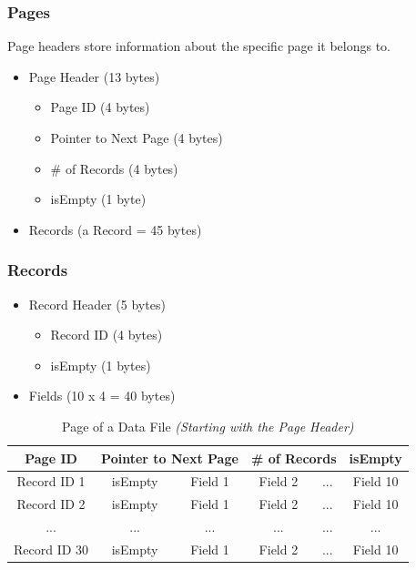 \documentclass[12pt,a4paper]{article}
\begin{document}
        \subsubsection{Pages}
            Page headers store information about the specific page it belongs to.
            \begin{itemize}
              \item Page Header (13 bytes)
                \begin{itemize}
                     \item Page ID (4 bytes)
                    \item Pointer to Next Page (4 bytes)
                     \item \# of Records (4 bytes)
                     \item isEmpty (1 byte)
                \end{itemize}
              \item Records (a Record = 45 bytes)
            \end{itemize}
        \subsubsection{Records}
            \begin{itemize}
              \item Record Header (5 bytes)
                \begin{itemize}
                     \item Record ID (4 bytes)
                    \item isEmpty (1 bytes)
                \end{itemize}
              \item Fields (10 x 4 = 40 bytes)
            \end{itemize}

        \begin{table}[h!]
            \begin{center}
                \begin{tabular}{ | c | c | c | c | c | c | }
                \hline
                    \multicolumn{1}{||c|}{Page ID} &
                    \multicolumn{2}{|c|}{Pointer to Next Page} &
                    \multicolumn{2}{|c|}{\# of Records} &
                    \multicolumn{1}{|c||}{isEmpty} \\
                \hline
                \hline
                Record ID 1 & isEmpty & Field 1 & Field 2 & ... & Field 10 \\
                \hline
                Record ID 2 & isEmpty & Field 1 & Field 2 & ... & Field 10 \\
                \hline
                ... & ... & ... & ... & ... & ... \\
                \hline
                Record ID 30 & isEmpty & Field 1 & Field 2 & ... & Field 10 \\
                \hline
                \end{tabular}
            \end{center}
    \caption{Page of a Data File \emph{(Starting with the Page Header)}}
    \label{table:4}
    \end{table}
\end{document}
